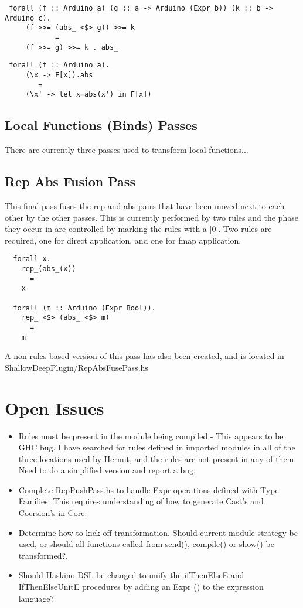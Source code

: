 \documentclass[11pt, oneside]{article}   	%
\begin{document}
\begin{verbatim}
 forall (f :: Arduino a) (g :: a -> Arduino (Expr b)) (k :: b -> Arduino c).
     (f >>= (abs_ <$> g)) >>= k
            =
     (f >>= g) >>= k . abs_
\end{verbatim}

\begin{verbatim}
 forall (f :: Arduino a).
     (\x -> F[x]).abs
        =
     (\x' -> let x=abs(x') in F[x])
\end{verbatim}

\subsection{Local Functions (Binds) Passes}

There are currently three passes used to transform local functions...

\subsection{Rep Abs Fusion Pass}

This final pass fuses the rep and abs pairs that have been moved next
to each other by the other passes.  This is currently performed by
two rules and the phase they occur in are controlled by marking the rules
with a [0].  Two rules are required, one for direct application, and one for
fmap application.

\begin{verbatim}
  forall x.
    rep_(abs_(x))
      =
    x

  forall (m :: Arduino (Expr Bool)).
    rep_ <$> (abs_ <$> m)
      =
    m
\end{verbatim}

A non-rules based version of this pass has also been created, and is
located in ShallowDeepPlugin/RepAbsFusePass.hs

\section{Open Issues}

\begin{itemize}
  \item Rules must be present in the module being compiled - This appears to be 
  GHC bug.  I have searched for rules defined in imported modules in all of the
  three locations used by Hermit, and the rules are not present in any of them. 
  Need to do a simplified version and report a bug.
  \item Complete RepPushPass.hs to handle Expr operations defined with
  Type Families.  This requires understanding of how to generate Cast's and
  Coersion's in Core.
  \item Determine how to kick off transformation.  Should current module 
  strategy be used, or should all functions called from send(), compile() or
  show() be transformed?.
  \item Should Haskino DSL be changed to unify the ifThenElseE and IfThenElseUnitE
  procedures by adding an Expr () to the expression language?
\end{itemize}
\end{document}

